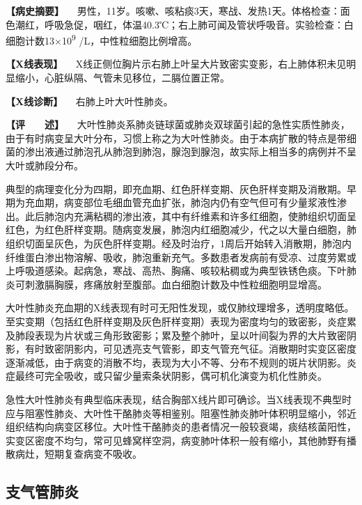 \textbf{【病史摘要】}
　男性，11岁。咳嗽、咳粘痰3天，寒战、发热1天。体格检查：面色潮红，呼吸急促，咽红，体温40.3℃；右上肺可闻及管状呼吸音。实验检查：白细胞计数13×10\textsuperscript{9}
/L，中性粒细胞比例增高。

\textbf{【X线表现】}
　X线正侧位胸片示右肺上叶呈大片致密实变影，右上肺体积未见明显缩小，心脏纵隔、气管未见移位，二膈位置正常。

\textbf{【X线诊断】} 　右肺上叶大叶性肺炎。

\textbf{【评　　述】}
　大叶性肺炎系肺炎链球菌或肺炎双球菌引起的急性实质性肺炎，由于有时病变呈大叶分布，习惯上称之为大叶性肺炎。由于本病扩散的特点是带细菌的渗出液通过肺泡孔从肺泡到肺泡，腺泡到腺泡，故实际上相当多的病例并不呈大叶或肺段分布。

典型的病理变化分为四期，即充血期、红色肝样变期、灰色肝样变期及消散期。早期为充血期，病变部位毛细血管充血扩张，肺泡内仍有空气但可有少量浆液性渗出。此后肺泡内充满粘稠的渗出液，其中有纤维素和许多红细胞，使肺组织切面呈红色，为红色肝样变期。随病变发展，肺泡内红细胞减少，代之以大量白细胞，肺组织切面呈灰色，为灰色肝样变期。经及时治疗，1周后开始转入消散期，肺泡内纤维蛋白渗出物溶解、吸收，肺泡重新充气。多数患者发病前有受凉、过度劳累或上呼吸道感染。起病急，寒战、高热、胸痛、咳较粘稠或为典型铁锈色痰。下叶肺炎可刺激膈胸膜，疼痛放射至腹部。血白细胞计数及中性粒细胞明显增高。

大叶性肺炎充血期的X线表现有时可无阳性发现，或仅肺纹理增多，透明度略低。至实变期（包括红色肝样变期及灰色肝样变期）表现为密度均匀的致密影，炎症累及肺段表现为片状或三角形致密影；累及整个肺叶，呈以叶间裂为界的大片致密阴影，有时致密阴影内，可见透亮支气管影，即支气管充气征。消散期时实变区密度逐渐减低，由于病变的消散不均，表现为大小不等、分布不规则的斑片状阴影。炎症最终可完全吸收，或只留少量索条状阴影，偶可机化演变为机化性肺炎。

急性大叶性肺炎有典型临床表现，结合胸部X线片即可确诊。当X线表现不典型时应与阻塞性肺炎、大叶性干酪肺炎等相鉴别。阻塞性肺炎肺叶体积明显缩小，邻近组织结构向病变区移位。大叶性干酪肺炎的患者情况一般较衰竭，痰结核菌阳性，实变区密度不均匀，常可见蜂窝样空洞，病变肺叶体积一般有缩小，其他肺野有播散病灶，短期复查病变不吸收。

\subsection{支气管肺炎}

